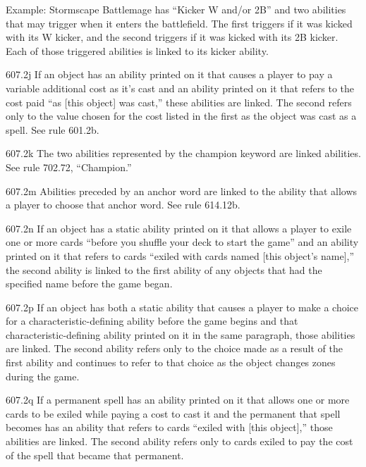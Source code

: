 Example: Stormscape Battlemage has “Kicker {W} and/or {2}{B}” and two abilities that may trigger when it enters the battlefield. The first triggers if it was kicked with its {W} kicker, and the second triggers if it was kicked with its {2}{B} kicker. Each of those triggered abilities is linked to its kicker ability.

607.2j If an object has an ability printed on it that causes a player to pay a variable additional cost as it’s cast and an ability printed on it that refers to the cost paid “as [this object] was cast,” these abilities are linked. The second refers only to the value chosen for the cost listed in the first as the object was cast as a spell. See rule 601.2b.

607.2k The two abilities represented by the champion keyword are linked abilities. See rule 702.72, “Champion.”

607.2m Abilities preceded by an anchor word are linked to the ability that allows a player to choose that anchor word. See rule 614.12b.

607.2n If an object has a static ability printed on it that allows a player to exile one or more cards “before you shuffle your deck to start the game” and an ability printed on it that refers to cards “exiled with cards named [this object’s name],” the second ability is linked to the first ability of any objects that had the specified name before the game began.

607.2p If an object has both a static ability that causes a player to make a choice for a characteristic-defining ability before the game begins and that characteristic-defining ability printed on it in the same paragraph, those abilities are linked. The second ability refers only to the choice made as a result of the first ability and continues to refer to that choice as the object changes zones during the game.

607.2q If a permanent spell has an ability printed on it that allows one or more cards to be exiled while paying a cost to cast it and the permanent that spell becomes has an ability that refers to cards “exiled with [this object],” those abilities are linked. The second ability refers only to cards exiled to pay the cost of the spell that became that permanent.

